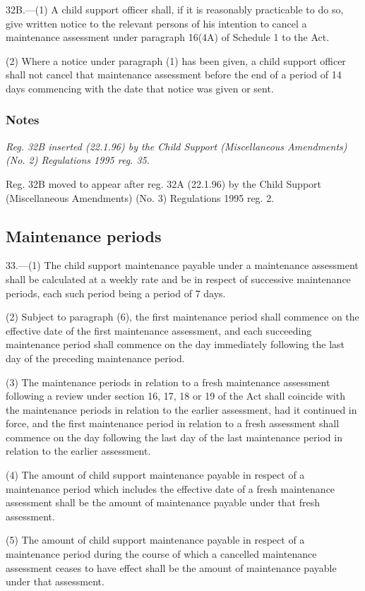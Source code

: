 \documentclass[a4paper]{article}
\newcommand\amendment[1]{\subsubsection*{Notes}{\itshape\frenchspacing\footnotesize #1 \par}}
\begin{document}
32B.—(1) A child support officer shall, if it is reasonably practicable to do so, give written notice to the relevant persons of his intention to cancel a maintenance assessment under paragraph 16(4A) of Schedule 1 to the Act.

(2) Where a notice under paragraph (1) has been given, a child support officer shall not cancel that maintenance assessment before the end of a period of 14 days commencing with the date that notice was given or sent.

\amendment{
Reg. 32B inserted (22.1.96) by the Child Support (Miscellaneous Amendments) (No. 2) Regulations 1995 reg. 35.

Reg. 32B moved to appear after reg. 32A (22.1.96) by the Child Support (Miscellaneous Amendments) (No. 3) Regulations 1995 reg. 2.
}

\subsection[33. Maintenance periods]{Maintenance periods}

33.—(1) The child support maintenance payable under a maintenance assessment shall be calculated at a weekly rate and be in respect of successive maintenance periods, each such period being a period of 7 days.

(2) Subject to paragraph (6), the first maintenance period shall commence on the effective date of the first maintenance assessment, and each succeeding maintenance period shall commence on the day immediately following the last day of the preceding maintenance period.

(3) The maintenance periods in relation to a fresh maintenance assessment following a review under section 16, 17, 18 or 19 of the Act shall coincide with the maintenance periods in relation to the earlier assessment, had it continued in force, and the first maintenance period in relation to a fresh assessment shall commence on the day following the last day of the last maintenance period in relation to the earlier assessment.

(4) The amount of child support maintenance payable in respect of a maintenance period which includes the effective date of a fresh maintenance assessment shall be the amount of maintenance payable under that fresh assessment.

(5) The amount of child support maintenance payable in respect of a maintenance period during the course of which a cancelled maintenance assessment ceases to have effect shall be the amount of maintenance payable under that assessment.
\end{document}
